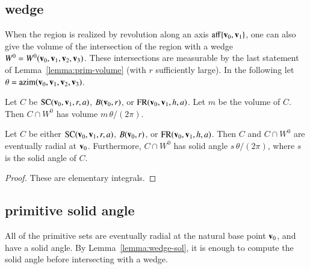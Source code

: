 \subsection{wedge}\label{sec:wedge}
%

When the region is realized by revolution along an axis ${\operatorname{aff}}\{{\mathbf v}_0,{\mathbf v}_1\}$, 
one can also give the volume of the intersection of the region
with a wedge $W^0=W^0({\mathbf v}_0,{\mathbf v}_1,{\mathbf v}_2,{\mathbf v}_3)$.  These intersections are measurable
by the last statement of Lemma~\ref{lemma:prim-volume} (with $r$ sufficiently
large).
  In the following
let $\theta = {\operatorname{azim}}({\mathbf v}_0,{\mathbf v}_1,{\mathbf v}_2,{\mathbf v}_3)$.
%
%

\begin{lemma}  Let $C$ be ${\operatorname{SC}}({\mathbf v}_0,{\mathbf v}_1,r,a)$, $B({\mathbf v}_0,r)$, or
   ${\operatorname{FR}}({\mathbf v}_0,{\mathbf v}_1,h,a)$.  Let $m$ be the volume of $C$.  
   Then $C\cap W^0$ has volume $m\,\theta/(2\pi)$.   
\end{lemma}
%

\begin{lemma}  Let $C$ be either ${\operatorname{SC}}({\mathbf v}_0,{\mathbf v}_1,r,a)$, $B({\mathbf v}_0,r)$, or
   ${\operatorname{FR}}({\mathbf v}_0,{\mathbf v}_1,h,a)$.  Then $C$ and $C\cap W^0$ are eventually 
radial at ${\mathbf v}_0$. Furthermore,
    $C\cap W^0$ has solid angle 
  $s\,\theta/(2\pi)$, where $s$ is the solid angle of $C$.
\end{lemma}


\begin{proof}
These are elementary integrals.
\end{proof}


\subsection{primitive solid angle}

All of the primitive sets are eventually radial at the natural
base point ${\mathbf v}_0$, and have a
solid angle.  By Lemma~\ref{lemma:wedge-sol}, it is enough to compute
the solid angle before intersecting with a wedge.
%

